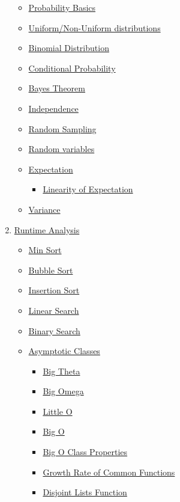 \documentclass{article}
\begin{document}
\begin{spacing}{1.5}
\begin{enumerate}
\begin{itemize}
    \item \hyperref[sec:pbasics]{Probability Basics}
    \item \hyperref[sec:uniform]{Uniform/Non-Uniform distributions}
    \item \hyperref[sec:binomial_distribution]{Binomial Distribution}
    \item \hyperref[sec:conditional]{Conditional Probability}
    \item \hyperref[sec:bayes]{Bayes Theorem}
    \item \hyperref[sec:independence]{Independence}
    \item \hyperref[sec:rsampling]{Random Sampling}
    \item \hyperref[sec:rvariables]{Random variables}
    \item \hyperref[sec:expectation]{Expectation}
    \begin{itemize}
        \item \hyperref[sec:lexpectation]{Linearity of Expectation}
    \end{itemize}
    \item \hyperref[sec:variance]{Variance}
\end{itemize}
\item \hyperref[sec:runtime]{Runtime Analysis{}}
\begin{itemize}
    \item \hyperref[sec:minsort]{Min Sort}
    \item \hyperref[sec:bubblesort]{Bubble Sort}
    \item \hyperref[sec:insertionsort]{Insertion Sort}
    \item \hyperref[sec:linearsearch]{Linear Search}
    \item \hyperref[sec:binarysearch]{Binary Search}
    \item \hyperref[sec:asymptotic]{Asymptotic Classes}
    \begin{itemize}
        \item \hyperref[sec:theta]{Big Theta}
        \item \hyperref[sec:omega]{Big Omega}
        \item \hyperref[sec:littleo]{Little O}
        \item \hyperref[sec:bigo]{Big O}
        \item \hyperref[sec:oproperties]{Big O Class Properties}
        \item \hyperref[sec:functions]{Growth Rate of Common Functions}
        \item \hyperref[sec:disjoint]{Disjoint Lists Function}

\end{itemize}
\end{itemize}
\end{enumerate}
\end{spacing}
\end{document}
